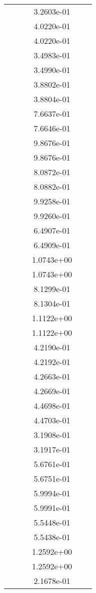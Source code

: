 \begin{xltabular}{\textwidth}{r|rS[table-format=1.3e+2]S[table-format=1.4e+2]S[table-format=1.4e+2]S[table-format=-1.5]}
&  &  & 3.2603e-01 & & \\
&  &  & 4.0220e-01 & & \\
&  &  & 4.0220e-01 & & \\
&  &  & 3.4983e-01 & & \\
&  &  & 3.4990e-01 & & \\
&  &  & 3.8802e-01 & & \\
&  &  & 3.8804e-01 & & \\
&  &  & 7.6637e-01 & & \\
&  &  & 7.6646e-01 & & \\
&  &  & 9.8676e-01 & & \\
&  &  & 9.8676e-01 & & \\
&  &  & 8.0872e-01 & & \\
&  &  & 8.0882e-01 & & \\
&  &  & 9.9258e-01 & & \\
&  &  & 9.9260e-01 & & \\
&  &  & 6.4907e-01 & & \\
&  &  & 6.4909e-01 & & \\
&  &  & 1.0743e+00 & & \\
&  &  & 1.0743e+00 & & \\
&  &  & 8.1299e-01 & & \\
&  &  & 8.1304e-01 & & \\
&  &  & 1.1122e+00 & & \\
&  &  & 1.1122e+00 & & \\
&  &  & 4.2190e-01 & & \\
&  &  & 4.2192e-01 & & \\
&  &  & 4.2663e-01 & & \\
&  &  & 4.2669e-01 & & \\
&  &  & 4.4698e-01 & & \\
&  &  & 4.4703e-01 & & \\
&  &  & 3.1908e-01 & & \\
&  &  & 3.1917e-01 & & \\
&  &  & 5.6761e-01 & & \\
&  &  & 5.6751e-01 & & \\
&  &  & 5.9994e-01 & & \\
&  &  & 5.9991e-01 & & \\
&  &  & 5.5448e-01 & & \\
&  &  & 5.5438e-01 & & \\
&  &  & 1.2592e+00 & & \\
&  &  & 1.2592e+00 & & \\
&  &  & 2.1678e-01 & & \\

\end{xltabular}
